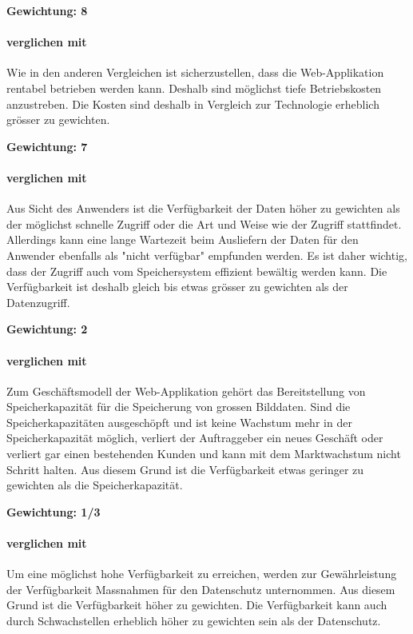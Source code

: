 \textbf{Gewichtung: 8}

\paragraph*{ verglichen mit }
Wie in den anderen Vergleichen ist sicherzustellen, dass die Web-Applikation rentabel betrieben werden kann. Deshalb sind möglichst tiefe Betriebskosten anzustreben. Die Kosten sind deshalb in Vergleich zur Technologie erheblich grösser zu gewichten.

\textbf{Gewichtung: 7}

\paragraph*{ verglichen mit }
Aus Sicht des Anwenders ist die Verfügbarkeit der Daten höher zu gewichten als der möglichst schnelle Zugriff oder die Art und Weise wie der Zugriff stattfindet. Allerdings kann eine lange Wartezeit beim Ausliefern der Daten für den Anwender ebenfalls als "nicht verfügbar" empfunden werden.  Es ist daher wichtig, dass der Zugriff auch vom Speichersystem effizient bewältig werden kann. Die Verfügbarkeit ist deshalb gleich bis etwas grösser zu gewichten als der Datenzugriff.

\textbf{Gewichtung: 2}

\paragraph*{ verglichen mit }
Zum Geschäftsmodell der Web-Applikation gehört das Bereitstellung von Speicherkapazität für die Speicherung von grossen Bilddaten. Sind die Speicherkapazitäten ausgeschöpft und ist keine Wachstum mehr in der Speicherkapazität möglich, verliert der Auftraggeber ein neues Geschäft oder verliert gar einen bestehenden Kunden und kann mit dem Marktwachstum nicht Schritt halten. Aus diesem Grund ist die Verfügbarkeit etwas geringer zu gewichten als die Speicherkapazität.

\textbf{Gewichtung: 1/3}

\paragraph*{ verglichen mit }
Um eine möglichst hohe Verfügbarkeit zu erreichen, werden zur Gewährleistung der Verfügbarkeit Massnahmen für den Datenschutz unternommen. Aus diesem Grund ist die Verfügbarkeit höher zu gewichten. 
Die Verfügbarkeit kann auch durch Schwachstellen erheblich höher zu gewichten sein als der Datenschutz.

